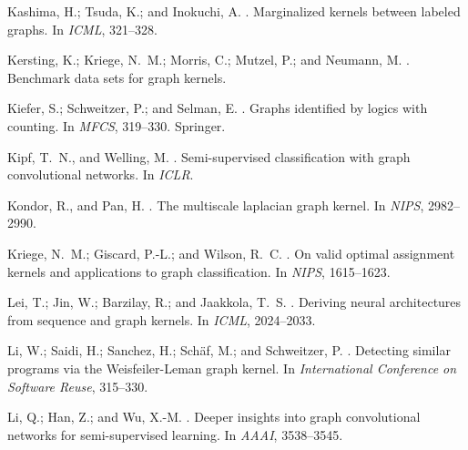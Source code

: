 \documentclass[letterpaper]{article}
\theoremstyle{definition}
\begin{document}
\begin{thebibliography}{}
	Kashima, H.; Tsuda, K.; and Inokuchi, A.
	.
	\newblock Marginalized kernels between labeled graphs.
	\newblock In {\em ICML},  321--328.
	
	Kersting, K.; Kriege, N.~M.; Morris, C.; Mutzel, P.; and Neumann, M.
	.
	\newblock Benchmark data sets for graph kernels.
	
	Kiefer, S.; Schweitzer, P.; and Selman, E.
	.
	\newblock Graphs identified by logics with counting.
	\newblock In {\em MFCS},  319--330.
	\newblock Springer.
	
	Kipf, T.~N., and Welling, M.
	.
	\newblock Semi-supervised classification with graph convolutional networks.
	\newblock In {\em ICLR}.
	
	Kondor, R., and Pan, H.
	.
	\newblock The multiscale laplacian graph kernel.
	\newblock In {\em NIPS},  2982--2990.
	
	Kriege, N.~M.; Giscard, P.-L.; and Wilson, R.~C.
	.
	\newblock On valid optimal assignment kernels and applications to graph
	classification.
	\newblock In {\em NIPS},  1615--1623.
	
	Lei, T.; Jin, W.; Barzilay, R.; and Jaakkola, T.~S.
	.
	\newblock Deriving neural architectures from sequence and graph kernels.
	\newblock In {\em ICML},  2024--2033.
	
	Li, W.; Saidi, H.; Sanchez, H.; Sch{\"{a}}f, M.; and Schweitzer, P.
	.
	\newblock Detecting similar programs via the {W}eisfeiler-{L}eman graph kernel.
	\newblock In {\em International Conference on Software Reuse},  315--330.
	
	Li, Q.; Han, Z.; and Wu, X.-M.
	.
	\newblock Deeper insights into graph convolutional networks for semi-supervised
	learning.
	\newblock In {\em AAAI},  3538--3545.
	

\end{thebibliography}
\end{document}
